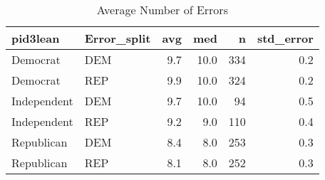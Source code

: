 \begin{table}[!htb]
\centering
\caption{Average Number of Errors} 
\label{tab:error_sum}
\begin{tabular}{llrrrr}
  \hline
pid3lean & Error\_split & avg & med & n & std\_error \\ 
  \hline
Democrat     & DEM & 9.7 & 10.0 & 334 & 0.2 \\ 
  Democrat     & REP & 9.9 & 10.0 & 324 & 0.2 \\ 
  Independent  & DEM & 9.7 & 10.0 & 94 & 0.5 \\ 
  Independent  & REP & 9.2 & 9.0 & 110 & 0.4 \\ 
  Republican   & DEM & 8.4 & 8.0 & 253 & 0.3 \\ 
  Republican   & REP & 8.1 & 8.0 & 252 & 0.3 \\ 
   \hline
\end{tabular}
\end{table}
